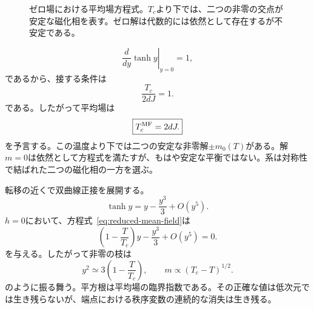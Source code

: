 \begin{figure}[ht]
\centering
{}
\caption{ゼロ場における平均場方程式。\(T_c\)より下では、二つの非零の交点が安定な磁化相を表す。ゼロ解は代数的には依然として存在するが不安定である。}
\label{fig:mean-field-intersections}
\end{figure}

\begin{equation}
\left.\frac{d}{dy}\tanh y\right|_{y=0}=1,
\end{equation}
であるから、接する条件は
\begin{equation}
\frac{T_c}{2dJ}=1.
\end{equation}
である。したがって平均場は
\begin{equation}
\boxed{T_c^{\rm MF}=2dJ.}
\label{eq:sm10-mean-field-tc}
\end{equation}
を予言する。この温度より下では二つの安定な非零解\(\pm m_0(T)\)がある。解\(m=0\)は依然として方程式を満たすが、もはや安定な平衡ではない。系は対称性で結ばれた二つの磁化相の一方を選ぶ。

\begin{classroomqa}
\end{classroomqa}

転移の近くで双曲線正接を展開する。
\begin{equation}
\tanh y=y-\frac{y^3}{3}+O(y^5).
\end{equation}
\(h=0\)において、方程式~\eqref{eq:reduced-mean-field}は
\begin{equation}
\left(1-\frac{T}{T_c}\right)y-\frac{y^3}{3}+O(y^5)=0.
\end{equation}
を与える。したがって非零の枝は
\begin{equation}
y^2\simeq3\left(1-\frac{T}{T_c}\right),
\qquad
m\propto(T_c-T)^{1/2}.
\label{eq:mf-beta-exponent}
\end{equation}
のように振る舞う。平方根は平均場の臨界指数である。その正確な値は低次元では生き残らないが、端点における秩序変数の連続的な消失は生き残る。


